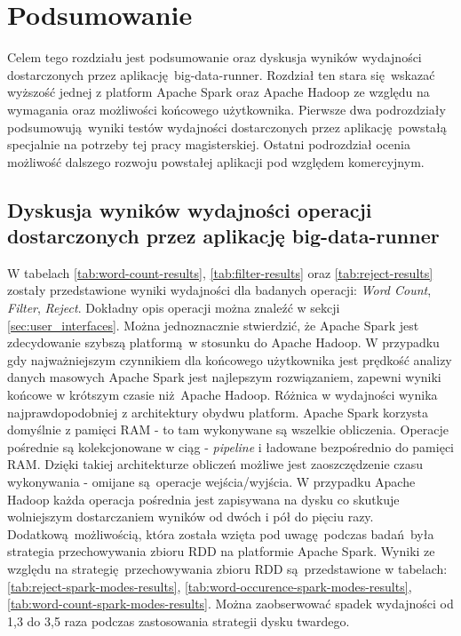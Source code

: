 \chapter{Podsumowanie} \label{chap.summary}
Celem tego rozdziału jest podsumowanie oraz dyskusja wyników wydajności dostarczonych przez aplikację big-data-runner. Rozdział ten stara się wskazać wyższość jednej z platform Apache Spark oraz Apache Hadoop ze względu na wymagania oraz możliwości końcowego użytkownika. Pierwsze dwa podrozdziały podsumowują wyniki testów wydajności dostarczonych przez aplikację powstałą specjalnie na potrzeby tej pracy magisterskiej. Ostatni podrozdział ocenia możliwość dalszego rozwoju powstałej aplikacji pod względem komercyjnym.   
\section{Dyskusja wyników wydajności operacji dostarczonych przez aplikację big-data-runner}
W tabelach \ref{tab:word-count-results}, \ref{tab:filter-results} oraz \ref{tab:reject-results} zostały przedstawione wyniki wydajności dla badanych operacji: \textit{Word Count}, \textit{Filter}, \textit{Reject}. Dokładny opis operacji można znaleźć w sekcji \ref{sec:user_interfaces}. Można jednoznacznie stwierdzić, że Apache Spark jest zdecydowanie szybszą platformą w stosunku do Apache Hadoop. W przypadku gdy najważniejszym czynnikiem dla końcowego użytkownika jest prędkość analizy danych masowych Apache Spark jest najlepszym rozwiązaniem, zapewni wyniki końcowe w krótszym czasie niż Apache Hadoop. Różnica w wydajności wynika najprawdopodobniej z architektury obydwu platform. Apache Spark korzysta domyślnie z pamięci RAM - to tam wykonywane są wszelkie obliczenia. Operacje pośrednie są kolekcjonowane w ciąg - \textit{pipeline} i ładowane bezpośrednio do pamięci RAM. Dzięki takiej architekturze obliczeń możliwe jest zaoszczędzenie czasu wykonywania - omijane są operacje wejścia/wyjścia. W przypadku Apache Hadoop każda operacja pośrednia jest zapisywana na dysku co skutkuje wolniejszym dostarczaniem wyników od dwóch i pół do pięciu razy. Dodatkową możliwością, która została wzięta pod uwagę podczas badań była strategia przechowywania zbioru RDD na platformie Apache Spark. Wyniki ze względu na strategię przechowywania zbioru RDD są przedstawione w tabelach: \ref{tab:reject-spark-modes-results}, \ref{tab:word-occurence-spark-modes-results}, \ref{tab:word-count-spark-modes-results}. Można zaobserwować spadek wydajności od 1,3 do 3,5 raza podczas zastosowania strategii dysku twardego. 
